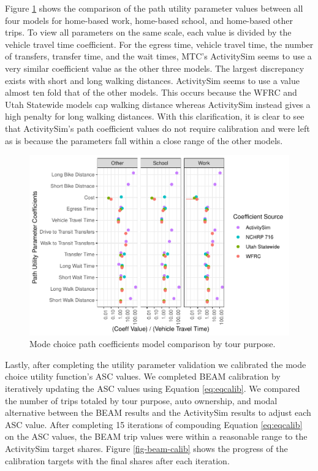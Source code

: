 \documentclass[fancy, masters]{byuthesis}
\begin{document}
Figure \ref{fig:coef} shows the comparison of the path utility parameter values between all four models for home-based work, home-based school, and home-based other trips. To view all parameters on the same scale, each value is divided by the vehicle travel time coefficient. For the egress time, vehicle travel time, the number of transfers, transfer time, and the wait times, MTC's ActivitySim seems to use a very similar coefficient value as the other three models. The largest discrepancy exists with short and long walking distances. ActivitySim seems to use a value almost ten fold that of the other models. This occurs because the WFRC and Utah Statewide models cap walking distance whereas ActivitySim instead gives a high penalty for long walking distances. With this clarification, it is clear to see that ActivitySim's path coefficient values do not require calibration and were left as is because the parameters fall within a close range of the other models.

\begin{figure}

{\centering \includegraphics{thesis_files/figure-latex/coef-1} 

}

\caption{Mode choice path coefficients model comparison by tour purpose.}\label{fig:coef}
\end{figure}

Lastly, after completing the utility parameter validation we calibrated the mode choice utility function's ASC values. We completed BEAM calibration by iteratively updating the ASC values using Equation \eqref{eq:eqcalib}. We compared the number of trips totaled by tour purpose, auto ownership, and modal alternative between the BEAM results and the ActivitySim results to adjust each ASC value. After completing 15 iterations of compouding Equation \eqref{eq:eqcalib} on the ASC values, the BEAM trip values were within a reasonable range to the ActivitySim target shares. Figure \ref{fig-beam-calib} shows the progress of the calibration targets with the final shares after each iteration.
\end{document}
